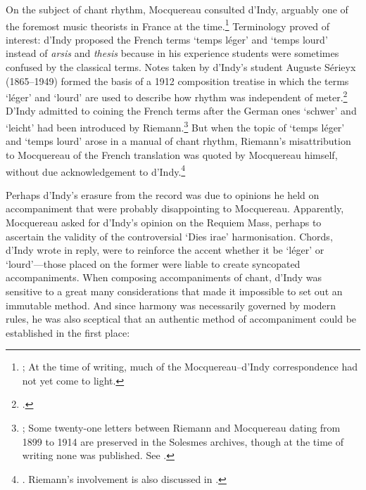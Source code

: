 \label{cc:dindy_rhythm}%
On the subject of chant rhythm, Mocquereau consulted d'Indy, arguably one of the foremost music theorists in France at the time.\footnote{\cite[For transcriptions of the available d'Indy--Mocquereau correspondence see][426--43]{HalaSolesmesmusiciensSchola2017}; At the time of writing, much of the Mocquereau--d'Indy correspondence had not yet come to light.}
Terminology proved of interest: d'Indy proposed the French terms `temps léger' and `temps lourd' instead of \emph{arsis} and \emph{thesis} because in his experience students were sometimes confused by the classical terms.
Notes taken by d'Indy's student Auguste Sérieyx (1865--1949) formed the basis of a 1912 composition treatise in which the terms `léger' and `lourd' are used to describe how rhythm was independent of meter.\footcite[26]{DIndyCourscompositionmusicale1912}
D'Indy admitted to coining the French terms after the German ones `schwer' and `leicht' had been introduced by Riemann.\footnote{; Some twenty-one letters between Riemann and Mocquereau dating from 1899 to 1914 are preserved in the Solesmes archives, though at the time of writing none was published. See \cite[410, n.~26]{HalaSolesmesmusiciensSchola2017}.}
But when the topic of `temps léger' and `temps lourd' arose in a manual of chant rhythm, Riemann's misattribution to Mocquereau of the French translation was quoted by Mocquereau himself, without due acknowledgement to d'Indy.\footnote{\cite[52 n.~1]{Mocquereaunombremusicalgregorien1908}. Riemann's involvement is also discussed in \cite[3 n.~11 and \emph{passim}]{WaldenDomMocquereauTheories2015}.}
\nowidow[2]

Perhaps d'Indy's erasure from the record was due to opinions he held on \mbox{accompaniment} that were probably disappointing to Mocquereau.
Apparently, Mocquereau asked for d'Indy's opinion on the Requiem Mass, perhaps to ascertain the validity of the controversial `Dies irae' harmonisation.
Chords, d'Indy wrote in reply, were to reinforce the accent whether it be `léger' or `lourd'---those placed on the former were liable to create syncopated accompaniments.
When composing accompaniments of chant, d'Indy was sensitive to a great many considerations that made it impossible to set out an immutable method.
And since harmony was necessarily governed by modern rules, he was also sceptical that an authentic method of accompaniment could be established in the first place:


